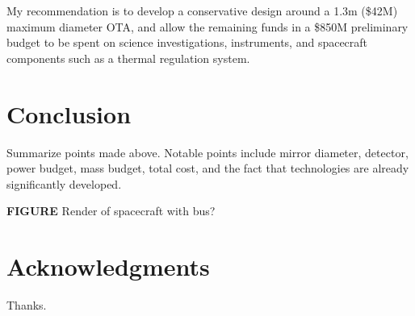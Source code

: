 \documentclass{ws-jai}
\begin{document}
My recommendation is to develop a conservative design around a 1.3m (\$42M) maximum diameter OTA, and allow the remaining funds in a \$850M preliminary budget to be spent on science investigations, instruments, and spacecraft components such as a thermal regulation system.

\section{Conclusion}
\label{S:conclusion}
Summarize points made above. Notable points include mirror diameter, detector, power budget, mass budget, total cost, and the fact that technologies are already significantly developed.

\textbf{FIGURE} Render of spacecraft with bus?

\section*{Acknowledgments}
Thanks.


\end{document}
